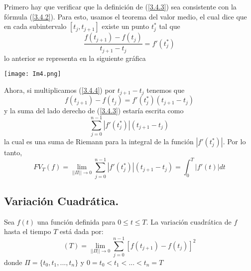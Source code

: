 \documentclass[11pt,notitlepage]{article}
\begin{document}
Primero hay que verificar que la definición de (\ref{3.4.3}) sea consistente con la fórmula (\ref{3.4.2}). Para esto, usamos el teorema del valor medio, el cual dice que en cada subintervalo \([t_j,t_{j+1}]\) existe un punto \(t_j^*\) tal que 
\begin{equation} \label{3.4.4}
\frac{f(t_{j+1})-f(t_j)}{t_{j+1}-t_j}=f'(t_j^*)
\end{equation}
lo anterior se representa en la siguiente gráfica
\begin{center}
  \texttt{[image: Im4.png]}  
\end{center}
Ahora, si multiplicamos (\ref{3.4.4}) por \(t_{j+1}-t_j\) tenemos que
\begin{equation*}
    f(t_{j+1})-f(t_j)=f'(t_j^*)(t_{j+1}-t_j)
\end{equation*}
y la suma del lado derecho de (\ref{3.4.3}) estaría escrita como
\begin{equation*}
    \sum_{j=0}^{n-1}|f'(t_j^*)|(t_{j+1}-t_j)
\end{equation*}
la cual es una suma de Riemann para la integral de la función \(|f'(t_j^*)|\). Por lo tanto, 
\begin{equation*}
    FV_T(f)= \lim_{||\Pi|| \to 0} \sum_{j=0}^{n-1}|f'(t_j^*)|(t_{j+1}-t_j)= \int_0^T |f'(t)|dt
\end{equation*}
\subsection{Variación Cuadrática.}
\begin{defi} \label{Secc1.13_Def1}
Sea  \(f(t)\) una función definida para \(0 \leq t \leq T\). La variación cuadrática de \(f\) hasta el tiempo \(T\) está dada por:
\begin{equation}
    [f,f](T)= \lim_{||\Pi|| \to 0} \sum_{j=0}^{n-1}\left[f(t_{j+1})-f(t_j)\right]^2
\end{equation}
donde \(\Pi=\{t_0,t_1,...,t_n\}\) y \(0=t_0<t_1<...<t_n=T\)
\end{defi}
\end{document}

